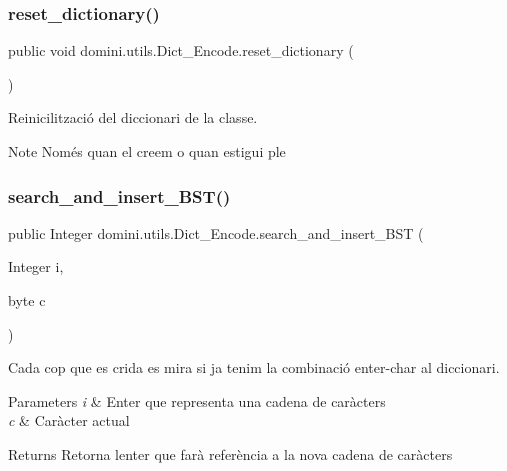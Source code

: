 \subsubsection{\texorpdfstring{reset\+\_\+dictionary()}{reset\_dictionary()}}
{\footnotesize\ttfamily public void domini.\+utils.\+Dict\+\_\+\+Encode.\+reset\+\_\+dictionary (\begin{DoxyParamCaption}{ }\end{DoxyParamCaption})\hspace{0.3cm}{\ttfamily [inline]}}



Reinicilització del diccionari de la classe. 

\begin{DoxyNote}{Note}
Només quan el creem o quan estigui ple 
\end{DoxyNote}
\mbox{\label{classdomini_1_1utils_1_1Dict__Encode_a1bafdca1835da3fa93b900ff0aa720e0}} 
\subsubsection{\texorpdfstring{search\+\_\+and\+\_\+insert\+\_\+\+B\+S\+T()}{search\_and\_insert\_BST()}}
{\footnotesize\ttfamily public Integer domini.\+utils.\+Dict\+\_\+\+Encode.\+search\+\_\+and\+\_\+insert\+\_\+\+B\+ST (\begin{DoxyParamCaption}\item[{Integer}]{i,  }\item[{byte}]{c }\end{DoxyParamCaption})\hspace{0.3cm}{\ttfamily [inline]}}



Cada cop que es crida es mira si ja tenim la combinació enter-\/char al diccionari. 


\begin{DoxyParams}{Parameters}
{\em i} & Enter que representa una cadena de caràcters \\
\hline
{\em c} & Caràcter actual \\
\hline
\end{DoxyParams}
\begin{DoxyReturn}{Returns}
Retorna l\textquotesingle{}enter que farà referència a la nova cadena de caràcters 
\end{DoxyReturn}


